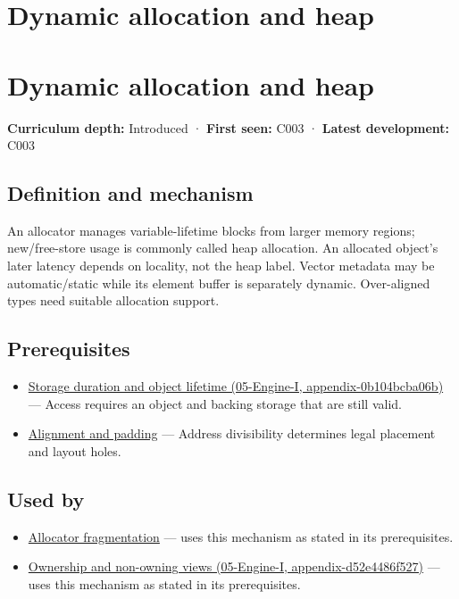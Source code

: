 \hypertarget{appendix-c3480f7d9ff3}{}
\section*{Dynamic allocation and heap}
\section{Dynamic allocation and heap}\label{dynamic-allocation-and-heap}

\textbf{Curriculum depth:} Introduced · \textbf{First seen:} C003 · \textbf{Latest development:} C003

\subsection{Definition and mechanism}\label{definition-and-mechanism}

An allocator manages variable-lifetime blocks from larger memory regions; new/free-store usage is commonly called heap allocation. An allocated object's later latency depends on locality, not the heap label. Vector metadata may be automatic/static while its element buffer is separately dynamic. Over-aligned types need suitable allocation support.

\subsection{Prerequisites}\label{prerequisites}

\begin{itemize}
\tightlist
\item
  \href{}{Storage duration and object lifetime (05-Engine-I, appendix-0b104bcba06b)} --- Access requires an object and backing storage that are still valid.
\item
  \hyperref[appendix-a1f7c53b4742]{Alignment and padding} --- Address divisibility determines legal placement and layout holes.
\end{itemize}

\subsection{Used by}\label{used-by}

\begin{itemize}
\tightlist
\item
  \hyperref[appendix-a7c50686d81f]{Allocator fragmentation} --- uses this mechanism as stated in its prerequisites.
\item
  \href{}{Ownership and non-owning views (05-Engine-I, appendix-d52e4486f527)} --- uses this mechanism as stated in its prerequisites.
\end{itemize}


